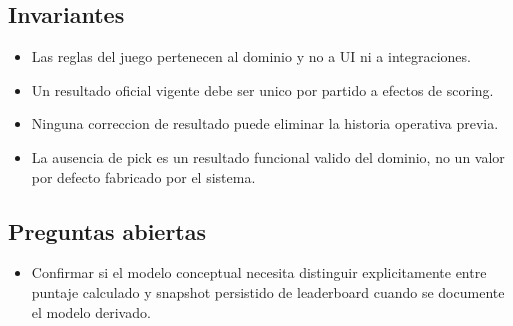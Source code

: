 \subsection{Invariantes}

\begin{itemize}
  \item Las reglas del juego pertenecen al dominio y no a UI ni a integraciones.
  \item Un resultado oficial vigente debe ser unico por partido a efectos de scoring.
  \item Ninguna correccion de resultado puede eliminar la historia operativa previa.
  \item La ausencia de pick es un resultado funcional valido del dominio, no un valor por defecto fabricado por el sistema.
\end{itemize}

\subsection{Preguntas abiertas}

\begin{itemize}
  \item Confirmar si el modelo conceptual necesita distinguir explicitamente entre puntaje calculado y snapshot persistido de leaderboard cuando se documente el modelo derivado.
\end{itemize}
